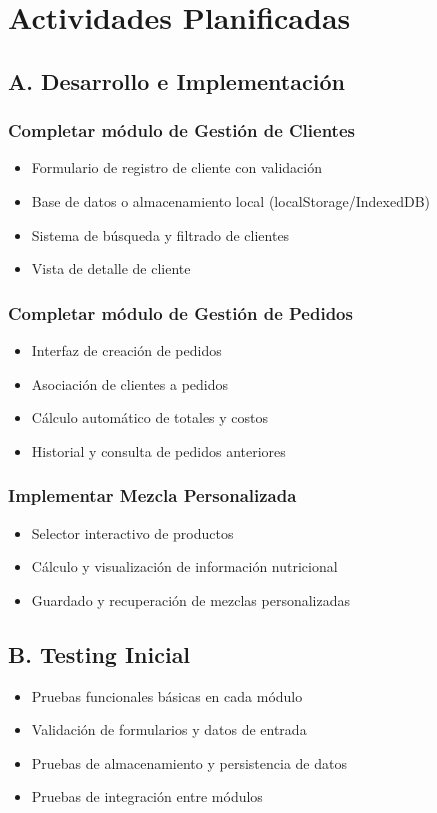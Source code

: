 \documentclass[12pt,a4paper]{report}
\begin{document}
\section{Actividades Planificadas}

\subsection{A. Desarrollo e Implementación}

\subsubsection{Completar módulo de Gestión de Clientes}
\begin{itemize}
    \item Formulario de registro de cliente con validación
    \item Base de datos o almacenamiento local (localStorage/IndexedDB)
    \item Sistema de búsqueda y filtrado de clientes
    \item Vista de detalle de cliente
\end{itemize}

\subsubsection{Completar módulo de Gestión de Pedidos}
\begin{itemize}
    \item Interfaz de creación de pedidos
    \item Asociación de clientes a pedidos
    \item Cálculo automático de totales y costos
    \item Historial y consulta de pedidos anteriores
\end{itemize}

\subsubsection{Implementar Mezcla Personalizada}
\begin{itemize}
    \item Selector interactivo de productos
    \item Cálculo y visualización de información nutricional
    \item Guardado y recuperación de mezclas personalizadas
\end{itemize}

\subsection{B. Testing Inicial}
\begin{itemize}
    \item Pruebas funcionales básicas en cada módulo
    \item Validación de formularios y datos de entrada
    \item Pruebas de almacenamiento y persistencia de datos
    \item Pruebas de integración entre módulos
\end{itemize}
\end{document}
